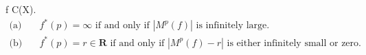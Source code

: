  f \in C(X). 
$$
\begin{aligned}
\text{(a)}\quad & f^*(p) = \infty \text{ if and only if } |M^p(f)| \text{ is infinitely large}. \\
\text{(b)}\quad & f^*(p) = r \in \mathbf{R} \text{ if and only if } |M^p(f) - r| \text{ is either infinitely small or zero}.
\end{aligned}
$$
